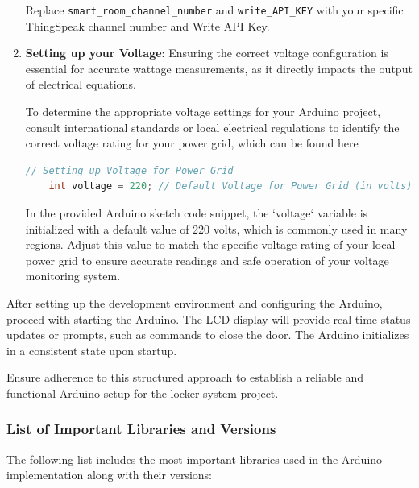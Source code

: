 \begin{enumerate}
    Replace \texttt{smart\_room\_channel\_number} and \texttt{write\_API\_KEY} with your specific ThingSpeak channel number and Write API Key.

    \item \textbf{Setting up your Voltage}:
    Ensuring the correct voltage configuration is essential for accurate wattage measurements, as it directly impacts the output of electrical equations.

    To determine the appropriate voltage settings for your 
    Arduino project, consult international 
    standards or local electrical regulations 
    to identify the correct voltage rating for 
    your power grid, which can be found here \cite{rei-world-electricity-guide}

    \begin{lstlisting}[language=C++, caption={Setting Voltage in Arduino Sketch}]
    // Setting up Voltage for Power Grid
    int voltage = 220; // Default Voltage for Power Grid (in volts)
    \end{lstlisting}

    In the provided Arduino sketch code snippet, the `voltage` variable is initialized with a default value of 220 volts, which is commonly used in many regions.
    Adjust this value to match the specific voltage rating of your local power grid to ensure accurate readings and safe operation of your voltage monitoring system.

\end{enumerate}

After setting up the development environment and configuring the Arduino,
proceed with starting the Arduino.
The LCD display will provide real-time status updates or prompts,
such as commands to close the door. 
The Arduino initializes in a consistent state upon startup.

Ensure adherence to this structured approach to establish a reliable 
and functional Arduino setup for the locker system project.

\subsubsection{List of Important Libraries and Versions}\label{sec:ArduinoLibaries}

The following list includes the most important libraries used in the Arduino implementation along with their versions:

